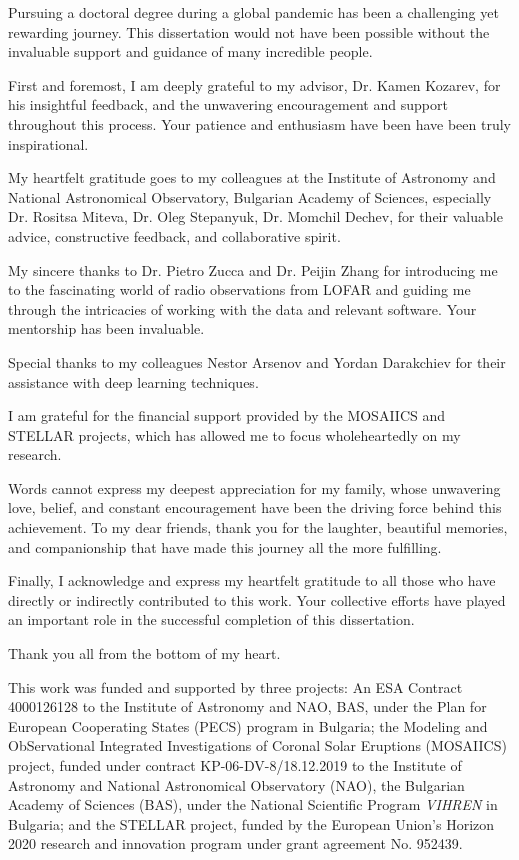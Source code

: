 Pursuing a doctoral degree during a global pandemic has been a challenging yet rewarding journey. This dissertation would not have been possible without the invaluable support and guidance of many incredible people.

First and foremost, I am deeply grateful to my advisor, Dr. Kamen Kozarev, for his insightful feedback, and the unwavering encouragement and support throughout this process. Your patience and enthusiasm have been have been truly inspirational.

My heartfelt gratitude goes to my colleagues at the Institute of Astronomy and National Astronomical Observatory, Bulgarian Academy of Sciences, especially Dr. Rositsa Miteva, Dr. Oleg Stepanyuk, Dr. Momchil Dechev, for their valuable advice, constructive feedback, and collaborative spirit.

My sincere thanks to Dr. Pietro Zucca and Dr. Peijin Zhang for introducing me to the fascinating world of radio observations from LOFAR and guiding me through the intricacies of working with the data and relevant software. Your mentorship has been invaluable.

Special thanks to my colleagues Nestor Arsenov and Yordan Darakchiev for their assistance with deep learning techniques.

I am grateful for the financial support provided by the MOSAIICS and STELLAR projects, which has allowed me to focus wholeheartedly on my research.

Words cannot express my deepest appreciation for my family, whose unwavering love, belief, and constant encouragement have been the driving force behind this achievement. To my dear friends, thank you for the laughter, beautiful memories, and companionship that have made this journey all the more fulfilling.

Finally, I acknowledge and express my heartfelt gratitude to all those who have directly or indirectly contributed to this work. Your collective efforts have played an important role in the successful completion of this dissertation.

Thank you all from the bottom of my heart.

This work was funded and supported by three projects: An ESA Contract 4000126128 to the Institute of Astronomy and NAO, BAS, under the Plan for European Cooperating States (PECS) program in Bulgaria; the Modeling and ObServational Integrated Investigations of Coronal Solar Eruptions (MOSAIICS) project, funded under contract KP-06-DV-8/18.12.2019 to the Institute of Astronomy and National Astronomical Observatory (NAO), the Bulgarian Academy of Sciences (BAS), under the National Scientific Program \textit{VIHREN} in Bulgaria; and the STELLAR project, funded by the European Union’s Horizon 2020 research and innovation program under grant agreement No. 952439.